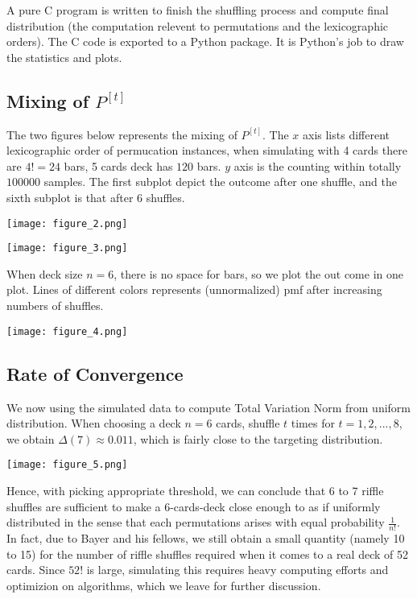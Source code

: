 \documentclass[a4paper, 11pt]{article}
\theoremstyle{definition}
\begin{document}
A pure C program is written to finish the shuffling process and compute final distribution (the computation relevent to permutations and the lexicographic orders). The C code is exported to a Python package. It is Python's job to draw the statistics and plots.

\subsection{Mixing of $P^{[t]}$}
The two figures below represents the mixing of $P^{[t]}$. The $x$ axis lists different lexicographic order of permucation instances, when simulating with 4 cards there are $4!=24$ bars, 5 cards deck has $120$ bars. $y$ axis is the counting within totally $100000$ samples. The first subplot depict the outcome after one shuffle, and the sixth subplot is that after 6 shuffles.

\texttt{[image: figure\_2.png]}

\texttt{[image: figure\_3.png]}

When deck size $n=6$, there is no space for bars, so we plot the out come in one plot. Lines of different colors represents (unnormalized) pmf after increasing numbers of shuffles.

\texttt{[image: figure\_4.png]}

\subsection{Rate of Convergence}
We now using the simulated data to compute Total Variation Norm from uniform distribution. When choosing a deck $n=6$ cards, shuffle $t$ times for $t=1, 2, ..., 8$, we obtain $\Delta(7)\approx 0.011$, which is fairly close to the targeting distribution.
\begin{center}
\texttt{[image: figure\_5.png]}
\end{center}
Hence, with picking appropriate threshold, we can conclude that 6 to 7 riffle shuffles are sufficient to make a 6-cards-deck close enough to as if uniformly distributed in the sense that each permutations arises with equal probability $\frac{1}{n!}$. In fact, due to Bayer and his fellows\cite{bayer}, we still obtain a small quantity (namely 10 to 15) for the number of riffle shuffles required when it comes to a real deck of 52 cards. Since $52!$ is large, simulating this requires heavy computing efforts and optimizion on algorithms, which we leave for further discussion.
\end{document}
